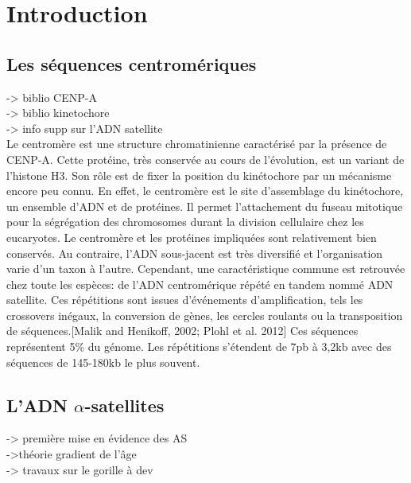 \documentclass[12pt,a4paper]{article}
\begin{document}

\newpage
\tableofcontents
\setcounter{page}{0}
\thispagestyle{empty}
\newpage 

\section{Introduction}
\subsection{Les séquences centromériques}
-> biblio CENP-A\\
-> biblio kinetochore\\
-> info supp sur l'ADN satellite\\

Le centromère est une structure chromatinienne caractérisé par la présence de CENP-A. Cette protéine, très conservée au cours de l'évolution, est un variant de l'histone H3. Son rôle est de fixer la position du kinétochore par un mécanisme encore peu connu. En effet, le centromère est le site d'assemblage du kinétochore, un ensemble d'ADN et de protéines. Il permet l'attachement du fuseau mitotique pour la ségrégation des chromosomes durant la division cellulaire chez les eucaryotes. Le centromère et les protéines impliquées sont relativement bien conservés. Au contraire, l'ADN sous-jacent est très diversifié et l'organisation varie d'un taxon à l'autre. Cependant, une caractéristique commune est retrouvée chez toute les espèces: de l'ADN centromérique répété en tandem nommé ADN satellite. Ces répétitions sont issues d'événements d'amplification, tels les crossovers inégaux, la conversion de gènes, les cercles roulants ou la transposition de séquences.[Malik and Henikoff, 2002; Plohl et al. 2012]
Ces séquences représentent 5\% du génome. Les répétitions s'étendent de 7pb à 3,2kb avec des séquences de 145-180kb le plus souvent.  

\subsection{L'ADN $\alpha$-satellites}
-> première mise en évidence des AS\\
->théorie gradient de l'âge\\
-> travaux sur le gorille à dev\\
\end{document}
